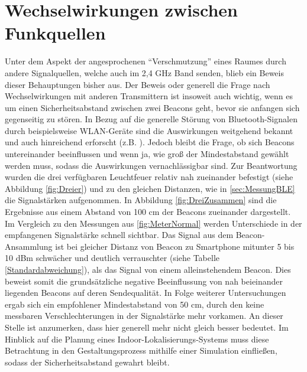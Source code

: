 \section{Wechselwirkungen zwischen Funkquellen} 
Unter dem Aspekt der angesprochenen "`Verschmutzung"' eines Raumes durch andere Signalquellen, welche auch im 2,4 GHz Band senden, blieb ein Beweis dieser Behauptungen bisher aus. Der Beweis oder generell die Frage nach Wechselwirkungen mit anderen Transmittern ist insoweit auch wichtig, wenn es um einen Sicherheitsabstand zwischen zwei Beacons geht, bevor sie anfangen sich gegenseitig zu stören. In Bezug auf die generelle Störung von Bluetooth-Signalen durch beispielsweise WLAN-Geräte sind die Auswirkungen weitgehend bekannt und auch hinreichend erforscht (z.B. \cite{InterBLEWLAN}). Jedoch bleibt die Frage, ob sich Beacons untereinander beeinflussen und wenn ja, wie groß der Mindestabstand gewählt werden muss, sodass die Auswirkungen vernachlässigbar sind. Zur Beantwortung wurden die drei verfügbaren Leuchtfeuer relativ nah zueinander befestigt (siehe Abbildung \ref{fig:Dreier}) und zu den gleichen Distanzen, wie in \ref{sec:MessungBLE} die Signalstärken aufgenommen. In Abbildung \ref{fig:DreiZusammen} sind die Ergebnisse aus einem Abstand von 100 cm der Beacons zueinander dargestellt. Im Vergleich zu den Messungen aus \ref{fig:MeterNormal} werden Unterschiede in der empfangenen Signalstärke schnell sichtbar. Das Signal aus dem Beacon-Ansammlung ist bei gleicher Distanz von Beacon zu Smartphone mitunter 5 bis 10 dBm schwächer und deutlich verrauschter (siehe Tabelle \ref{Standardabweichung}), als das Signal von einem alleinstehendem Beacon. Dies beweist somit die grundsätzliche negative Beeinflussung von nah beieinander liegenden Beacons auf deren Sendequalität. In Folge weiterer Untersuchungen ergab sich ein empfohlener Mindestabstand von 50 cm, durch den keine messbaren Verschlechterungen in der Signalstärke mehr vorkamen. An dieser Stelle ist anzumerken, dass hier generell mehr nicht gleich besser bedeutet. Im Hinblick auf die Planung eines Indoor-Lokalisierungs-Systems muss diese Betrachtung in den Gestaltungsprozess mithilfe einer Simulation einfließen, sodass der Sicherheitsabstand gewahrt bleibt.
